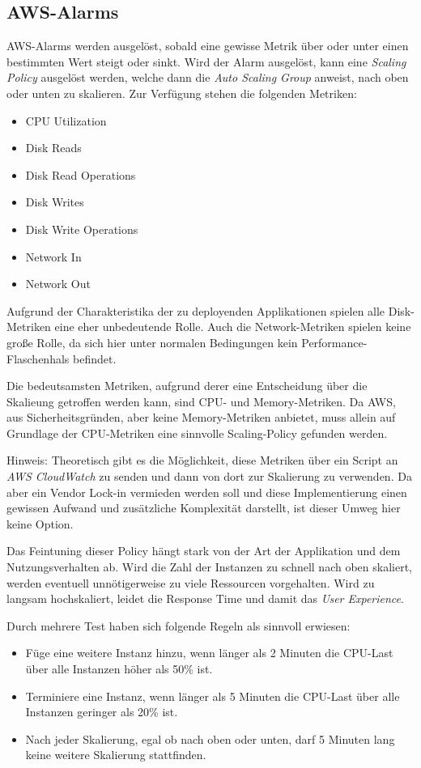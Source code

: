 \subsection{AWS-Alarms}

AWS-Alarms werden ausgelöst, sobald eine gewisse Metrik über oder unter einen
bestimmten Wert steigt oder sinkt. Wird der Alarm ausgelöst, kann eine
\emph{Scaling Policy} ausgelöst werden, welche dann die
\emph{Auto Scaling Group} anweist, nach oben
oder unten zu skalieren.
Zur Verfügung stehen die folgenden Metriken:

\begin{itemize}
  \item CPU Utilization
  \item Disk Reads
  \item Disk Read Operations
  \item Disk Writes
  \item Disk Write Operations
  \item Network In
  \item Network Out
\end{itemize}

Aufgrund der Charakteristika der zu deployenden Applikationen spielen
alle Disk-Metriken
eine eher unbedeutende Rolle.
Auch die Network-Metriken spielen keine große Rolle,
da sich hier unter normalen Bedingungen kein Performance-Flaschenhals
befindet.

Die bedeutsamsten Metriken, aufgrund derer eine Entscheidung über die
Skalieung getroffen werden kann, sind CPU- und Memory-Metriken.
Da AWS, aus Sicherheitsgründen, aber keine Memory-Metriken anbietet,
muss allein auf Grundlage der CPU-Metriken eine sinnvolle Scaling-Policy
gefunden werden.
\begin{tcolorbox}
  Hinweis: Theoretisch gibt es die Möglichkeit, diese Metriken über ein Script
  an \emph{AWS CloudWatch} zu senden und dann von dort zur Skalierung zu verwenden.
  Da aber ein Vendor Lock-in vermieden werden soll und diese Implementierung
  einen gewissen Aufwand und zusätzliche Komplexität darstellt,
  ist dieser Umweg hier keine Option.
\end{tcolorbox}
Das Feintuning dieser Policy hängt stark von der Art der Applikation
und dem Nutzungsverhalten ab.
Wird die Zahl der Instanzen zu schnell nach oben skaliert, werden eventuell
unnötigerweise zu viele Ressourcen vorgehalten.
Wird zu langsam hochskaliert, leidet die Response Time und damit
das \emph{User Experience}.

Durch mehrere Test haben sich folgende Regeln als sinnvoll erwiesen:
\begin{itemize}
  \item Füge eine weitere Instanz hinzu, wenn länger als 2 Minuten die
  CPU-Last über alle
  Instanzen höher als 50\% ist.
  \item Terminiere eine Instanz, wenn länger als 5 Minuten die
  CPU-Last über alle
  Instanzen geringer als 20\% ist.
  \item Nach jeder Skalierung, egal ob nach oben oder unten, darf 5 Minuten
  lang keine weitere Skalierung stattfinden.
\end{itemize}

